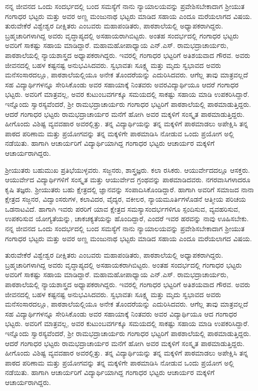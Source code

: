 {ನನ್ನ ಜೀವನದ ಒಂದು ಸಂದರ್ಭದಲ್ಲಿ  ಬಂದ ಸಮಸ್ಯೆಗೆ ನಾನು ನ್ಯಾಯಾಲಯವನ್ನು ಪ್ರವೇಶಿಸಬೇಕಾದಾಗ ಶ್ರೀಯುತ ಗಂಗಾಧರ ಭಟ್ಟರು ಮತ್ತು ಅವರ ಅಣ್ಣ ಮಂಜುನಾಥ ಭಟ್ಟರು ಮಾಡಿದ ಸಹಾಯ ಎಂದೂ ಮರೆಯಲಾಗದ ವಿಷಯ. ತುರುವೇಕೆರೆ ವಿಶ್ವೇಶ್ವರ ದೀಕ್ಷಿತರು ಎಂಬವರು ಮಹಾಪಂಡಿತರು, ಪಾಠಶಾಲೆಯಲ್ಲಿ ಅಧ್ಯಾಪಕರಾಗಿದ್ದರು. ಬ್ರಹ್ಮಚಾರಿಗಳಾಗಿದ್ದ ಅವರು ವೃದ್ಧಾಪ್ಯದಲ್ಲಿ ಅಸಹಾಯರಾಗಿಬಿಟ್ಟರು. ಅಂತಹ ಸಂದರ್ಭದಲ್ಲಿ ಗಂಗಾಧರ ಭಟ್ಟರು ಅವರಿಗೆ ಸಾಕಷ್ಟು ಸಹಾಯ ಮಾಡಿದ್ದಾರೆ. ಮಹಾಮಹೋಪಾಧ್ಯಾಯ ಎನ್.ಎಸ್. ರಾಮಭದ್ರಾಚಾರ್ಯರು, ಪಾಠಶಾಲೆಯಲ್ಲಿ ನ್ಯಾಯಶಾಸ್ತ್ರದ ಅಧ್ಯಾಪಕರಾಗಿದ್ದರು. ಇವರಲ್ಲಿ ಗಂಗಾಧರ ಭಟ್ಟರಿಗೆ ಅತಿಶಯ\-ವಾದ ಗೌರವ. ಅವರು ಜೀವನದಲ್ಲಿ ಬಹಳ ಕಷ್ಟ\enginline{-}ನಷ್ಟ ಅನುಭವಿಸಿದವರು. ಸ್ವಭಾವತಃ ಸೂಕ್ಷ್ಮ ಮತ್ತು ಮೃದು ಸ್ವಭಾವದ ಅವರು ಮನೆ\enginline{-}ಸಂಸಾರದಲ್ಲೂ, ಪಾಠ\-ಶಾಲೆಯಲ್ಲಿಯೂ ಅನೇಕ ತೊಂದರೆಯನ್ನು ಎದುರಿಸಿದವರು. ಆಗೆಲ್ಲ ತಾವು ಮಾತ್ರ\-ವಲ್ಲದೆ ಸಹ ವಿದ್ಯಾರ್ಥಿಗಳನ್ನೂ ಸೇರಿಸಿಕೊಂಡು ಅವರ ಸಹಾಯಾಕ್ಕೆ ನಿಂತವರು ಅವರ\break ವಿದ್ಯಾರ್ಥಿಯೂ ಆದರೆ \hbox{ಗಂಗಾಧರ} ಭಟ್ಟರು. ಅವರಿಗೆ ಮಾತ್ರವಲ್ಲ, ಅವರ  ಕುಟುಂಬ\-ವರ್ಗಕ್ಕೂ ಸಮಯದಲ್ಲಿ ಸಾಕಷ್ಟು ಸಹಾಯ ಮಾಡಿ ಉಪಕರಿಸಿದ್ದಾರೆ. ಇನ್ನೊಂದು ಸ್ವಾರಸ್ಯವೆಂದರೆ, ಶ್ರೀ ರಾಮಭದ್ರಾಚಾರ್ಯರು ಗಂಗಾಧರ ಭಟ್ಟರಿಗೆ ಪಾಠಶಾಲೆಯಲ್ಲಿ ಪಾಠಮಾಡುತ್ತಿದ್ದರು. ಆದರೆ ಗಂಗಾಧರ ಭಟ್ಟರು ರಾಮಭದ್ರಾಚಾರ್ಯರ  ಮನೆಗೆ ಹೋಗಿ ಅವರ ಮಕ್ಕಳಿಗೆ ಸಂಸ್ಕೃತ ಪಾಠಮಾಡುತ್ತಿದ್ದರು. ಹೀಗೊಂದು ವಿಶಿಷ್ಟ ವ್ಯವವಹಾರ ಅವರಲ್ಲಿತ್ತು. ತನ್ನ ವಿದ್ಯಾರ್ಥಿಯನ್ನು ತನ್ನ ಮಕ್ಕಳಿಗೆ ಪಾಠಮಾಡಲು ಅಪೇಕ್ಷಿಸಿ ತನ್ನ ಪಾಠದ ಪರಿಣಾಮ ಮತ್ತು ಪ್ರಯೋಗವನ್ನು ತನ್ನ ಮಕ್ಕಳಿಗೇ ಪಾಠಮಾಡಿಸಿ ನೋಡುವ ಒಂದು ಪ್ರಯೋಗ ಅಲ್ಲಿ ನಡೆಯಿತು.  ಹಾಗಾಗಿ ಆಚಾರ್ಯರಿಗೆ ವಿದ್ಯಾರ್ಥಿಯಾಗಿದ್ದ \hbox{ಗಂಗಾಧರ} ಭಟ್ಟರು  ಆಚಾರ್ಯರ ಮಕ್ಕಳಿಗೆ ಆಚಾರ್ಯರಾಗಿದ್ದರು.

ಶ್ರೀಯುತರು ಬಹುಮುಖ ಪ್ರತಿಭೆಯುಳ್ಳವರು. ಸಜ್ಜನರು, ಶಾಸ್ತ್ರಜ್ಞರು. ಕಲಾ \hbox{ರಸಿಕರು.} ಆಯುರ್ವೇದದಲ್ಲೂ ಆಸಕ್ತರು. ಆಯುರ್ವೇದ ವಿದ್ಯಾರ್ಥಿಗಳಿಗೆ ಸಂಸ್ಕೃತ ಮತ್ತು ಆಯುರ್ವೇದ ಗ್ರಂಥವನ್ನು ಪಾಠಮಾಡಿದವರು. ನಗರವಾಸಿಗಳಾದರೂ ಕೃಷಿ ತಜ್ಞರು. \hbox{ಶ್ರೀಯುತರು} ಬಹು ಕ್ಷೇತ್ರದಲ್ಲಿ ಜ್ಞಾನವನ್ನು ಸಂಪಾದಿಸಿಕೊಂಡಿದ್ದಾರೆ. ಹಾಗಾಗಿ ಅವರಿಗೆ \hbox{ಸಮಾಜದ} ನಾನಾ ಕ್ಷೇತ್ರದ ಸಜ್ಜನರ, ವಿದ್ವಾಂಸರುಗಳ, ಕಲಾವಿದರ, ವೈದ್ಯರ, ವಕೀಲರ, ನ್ಯಾಯಮೂರ್ತಿಗಳೊಡನೆ  ಆತ್ಮೀಯ ಪರಿಚಯ   \enginline{-}  ಒಡನಾಟವಿದೆ. ಹಾಗಾಗಿ ಇವರು ಪರರಿಗೆ ಯಾವ ಕ್ಷೇತ್ರದ ಸಮಸ್ಯಾ\enginline{-}ಸಂದರ್ಭಗಳಿಗೂ ಸ್ಪಂದಿಸುವ, ವ್ಯವಹರಿಸುವ, ಉಪಕರಿಸುವ ಯೋಗ್ಯತೆಯನ್ನು, ಚಾಕಚಕ್ಯತೆಯನ್ನು ಹೊಂದಿದ್ದಾರೆ, ಎಂದರೆ ಇವರ ಹರವನ್ನು ನಾವು ಊಹಿಸಬೇಕು.  ನನ್ನ ಜೀವನದ ಒಂದು ಸಂದರ್ಭದಲ್ಲಿ  ಬಂದ ಸಮಸ್ಯೆಗೆ ನಾನು ನ್ಯಾಯಾಲಯವನ್ನು ಪ್ರವೇಶಿಸಬೇಕಾದಾಗ ಶ್ರೀಯುತ ಗಂಗಾಧರ ಭಟ್ಟರು ಮತ್ತು ಅವರ ಅಣ್ಣ ಮಂಜುನಾಥ ಭಟ್ಟರು ಮಾಡಿದ ಸಹಾಯ ಎಂದೂ ಮರೆಯಲಾಗದ ವಿಷಯ.

 ತುರುವೇಕೆರೆ ವಿಶ್ವೇಶ್ವರ ದೀಕ್ಷಿತರು ಎಂಬವರು ಮಹಾಪಂಡಿತರು, ಪಾಠಶಾಲೆಯಲ್ಲಿ ಅಧ್ಯಾಪಕರಾಗಿದ್ದರು. ಬ್ರಹ್ಮಚಾರಿಗಳಾಗಿದ್ದ ಅವರು ವೃದ್ಧಾಪ್ಯದಲ್ಲಿ \hbox{ಅಸಹಾಯಕ}\break ರಾಗಿಬಿಟ್ಟರು. ಅಂತಹ ಸಂದರ್ಭದಲ್ಲಿ ಗಂಗಾಧರ ಭಟ್ಟರು ಅವರಿಗೆ ಸಾಕಷ್ಟು ಸಹಾಯ ಮಾಡಿದ್ದಾರೆ. ಮಹಾಮಹೋಪಾಧ್ಯಾಯ ಎನ್.ಎಸ್. ರಾಮಭದ್ರಾಚಾರ್ಯರು, ಪಾಠಶಾಲೆಯಲ್ಲಿ ನ್ಯಾಯಶಾಸ್ತ್ರದ ಅಧ್ಯಾಪಕರಾಗಿದ್ದರು. ಇವರಲ್ಲಿ ಗಂಗಾಧರ ಭಟ್ಟರಿಗೆ ಅತಿಶಯ\-ವಾದ ಗೌರವ. ಅವರು ಜೀವನದಲ್ಲಿ ಬಹಳ ಕಷ್ಟ\enginline{-}ನಷ್ಟ ಅನುಭವಿಸಿದವರು. ಸ್ವಭಾವತಃ ಸೂಕ್ಷ್ಮ ಮತ್ತು ಮೃದು ಸ್ವಭಾವದ ಅವರು ಮನೆ\enginline{-}ಸಂಸಾರದಲ್ಲೂ, ಪಾಠ\-ಶಾಲೆಯಲ್ಲಿಯೂ ಅನೇಕ ತೊಂದರೆಯನ್ನು ಎದುರಿಸಿದವರು. ಆಗೆಲ್ಲ ತಾವು ಮಾತ್ರ\-ವಲ್ಲದೆ ಸಹ ವಿದ್ಯಾರ್ಥಿಗಳನ್ನೂ ಸೇರಿಸಿಕೊಂಡು ಅವರ ಸಹಾಯಾಕ್ಕೆ ನಿಂತವರು ಅವರ ವಿದ್ಯಾರ್ಥಿಯೂ ಆದ ಗಂಗಾಧರ ಭಟ್ಟರು. ಅವರಿಗೆ ಮಾತ್ರವಲ್ಲ, ಅವರ  ಕುಟುಂಬ\-ವರ್ಗಕ್ಕೂ ಸಮಯದಲ್ಲಿ ಸಾಕಷ್ಟು ಸಹಾಯ ಮಾಡಿ ಉಪಕರಿಸಿದ್ದಾರೆ. ಇನ್ನೊಂದು ಸ್ವಾರಸ್ಯವೆಂದರೆ, ಶ್ರೀ ರಾಮಭದ್ರಾಚಾರ್ಯರು ಗಂಗಾಧರ ಭಟ್ಟರಿಗೆ ಪಾಠಶಾಲೆಯಲ್ಲಿ ಪಾಠಮಾಡುತ್ತಿದ್ದರು. ಆದರೆ ಗಂಗಾಧರ ಭಟ್ಟರು ರಾಮಭದ್ರಾಚಾರ್ಯರ  ಮನೆಗೆ ಹೋಗಿ ಅವರ ಮಕ್ಕಳಿಗೆ ಸಂಸ್ಕೃತ ಪಾಠಮಾಡುತ್ತಿದ್ದರು. ಹೀಗೊಂದು ವಿಶಿಷ್ಟ ವ್ಯವವಹಾರ ಅವರಲ್ಲಿತ್ತು. ತನ್ನ ವಿದ್ಯಾರ್ಥಿಯನ್ನು ತನ್ನ ಮಕ್ಕಳಿಗೆ ಪಾಠಮಾಡಲು ಅಪೇಕ್ಷಿಸಿ ತನ್ನ ಪಾಠದ ಪರಿಣಾಮ ಮತ್ತು ಪ್ರಯೋಗವನ್ನು ತನ್ನ ಮಕ್ಕಳಿಗೇ ಪಾಠಮಾಡಿಸಿ ನೋಡುವ ಒಂದು ಪ್ರಯೋಗ ಅಲ್ಲಿ ನಡೆಯಿತು.  ಹಾಗಾಗಿ ಆಚಾರ್ಯರಿಗೆ ವಿದ್ಯಾರ್ಥಿಯಾಗಿದ್ದ \hbox{ಗಂಗಾಧರ} ಭಟ್ಟರು  ಆಚಾರ್ಯರ ಮಕ್ಕಳಿಗೆ ಆಚಾರ್ಯರಾಗಿದ್ದರು.
\vskip 3pt

}
